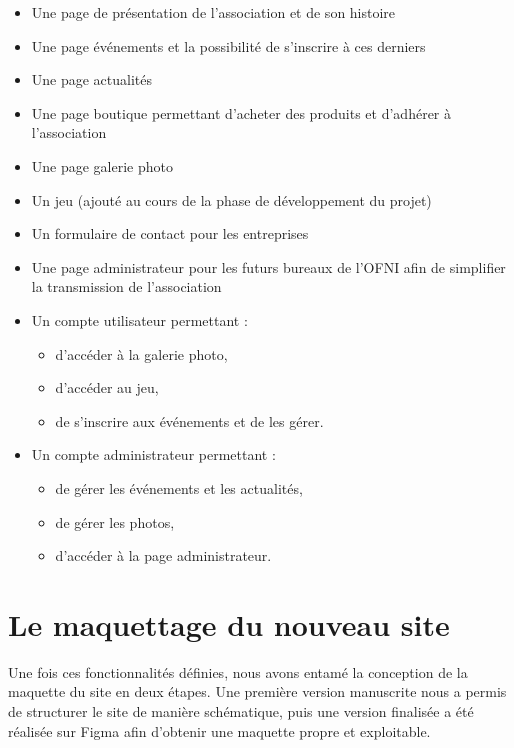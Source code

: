 \begin{itemize}
    \item Une page de présentation de l'association et de son histoire
    \item Une page événements et la possibilité de s'inscrire à ces derniers
    \item Une page actualités
    \item Une page boutique permettant d'acheter des produits et d'adhérer à l'association
    \item Une page galerie photo
    \item Un jeu (ajouté au cours de la phase de développement du projet)
    \item Un formulaire de contact pour les entreprises
    \item Une page administrateur pour les futurs bureaux de l'OFNI afin de simplifier la transmission de l'association
    \item Un compte utilisateur permettant : 
    \begin{itemize}
        \item d'accéder à la galerie photo,
        \item d'accéder au jeu,
        \item de s'inscrire aux événements et de les gérer.
    \end{itemize}
    \item Un compte administrateur permettant : 
    \begin{itemize}
        \item de gérer les événements et les actualités,
        \item de gérer les photos,
        \item d'accéder à la page administrateur.
    \end{itemize}
\end{itemize}

\section{Le maquettage du nouveau site}


Une fois ces fonctionnalités définies, nous avons entamé la conception de la maquette du site en deux étapes. Une première version manuscrite nous a permis de structurer le site de manière schématique, puis une version finalisée a été réalisée sur Figma afin d’obtenir une maquette propre et exploitable.

